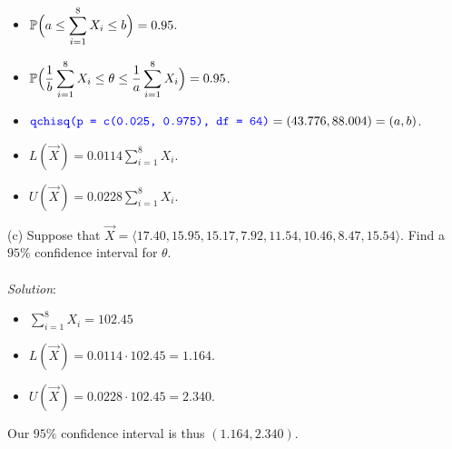 \documentclass[12pt]{article}
\newcommand{\XB}{\color{black}}
\newcommand{\XBB}{\color{blue}}
\newcommand{\ds}{\displaystyle}
\begin{document}
\begin{itemize}
    \item $ \ds \mathbb{P} \Bigl( a \le \sum_{i=1}^{8} X_{i} \le b \Bigr) = 0.95 $. \\
    \item $ \ds \mathbb{P} \Bigl( \frac{1}{b} \sum_{i=1}^{8} X_{i} \le \theta \le \frac{1}{a} \sum_{i=1}^{8} X_{i} \Bigr) = 0.95 $. \\
    \item $ \ds {\XBB \texttt{qchisq(p = c(0.025, 0.975), df = 64)}} = (43.776, 88.004) = (a, b) $.
    \item $ \ds L(\overrightarrow{X}) = 0.0114 \sum_{i=1}^{8} X_{i} $. \\
    \item $ \ds U(\overrightarrow{X}) = 0.0228 \sum_{i=1}^{8} X_{i} $. \\
\end{itemize}

\vspace{2.5mm}

(c) Suppose that $ \overrightarrow{X} = \langle 17.40, 15.95, 15.17, 7.92, 11.54, 10.46, 8.47, 15.54 \rangle $.
Find a $ 95\% $ confidence interval for $ \theta $. \\
\vspace{2.5mm} \\
\textit{Solution}:
\vspace{2.5mm} \\

\begin{itemize}
    \item $ \ds \sum_{i=1}^{8} X_{i} = 102.45 $
    \item $ \ds L(\overrightarrow{X}) = 0.0114 \cdot 102.45 = 1.164 $. \\
    \item $ \ds U(\overrightarrow{X}) = 0.0228 \cdot 102.45 = 2.340 $. \\
\end{itemize}

\noindent
Our $ 95\% $ confidence interval is thus $ (1.164, 2.340) $. \\

\vspace{2.5mm}

\newpage
\XBB\hrulefill\XB \\
\end{document}
